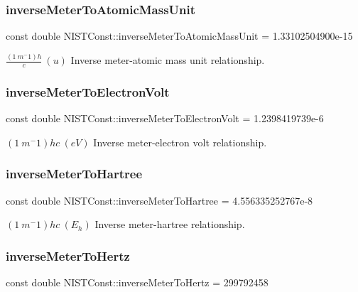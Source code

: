 \subsubsection{\texorpdfstring{inverse\+Meter\+To\+Atomic\+Mass\+Unit}{inverseMeterToAtomicMassUnit}}
{\footnotesize\ttfamily const double N\+I\+S\+T\+Const\+::inverse\+Meter\+To\+Atomic\+Mass\+Unit = 1.\+33102504900e-\/15}

$\frac{(1\ m^-1)h}{c} \ (u)$ Inverse meter-\/atomic mass unit relationship. \mbox{\label{group___inverse_meter_gafdede27a7699d3a180bb829b65fac447}} 
\subsubsection{\texorpdfstring{inverse\+Meter\+To\+Electron\+Volt}{inverseMeterToElectronVolt}}
{\footnotesize\ttfamily const double N\+I\+S\+T\+Const\+::inverse\+Meter\+To\+Electron\+Volt = 1.\+2398419739e-\/6}

$(1\ m^-1)hc \ (eV)$ Inverse meter-\/electron volt relationship. \mbox{\label{group___inverse_meter_ga6f47bdfe8997031b0f15229eb5bf4b9e}} 
\subsubsection{\texorpdfstring{inverse\+Meter\+To\+Hartree}{inverseMeterToHartree}}
{\footnotesize\ttfamily const double N\+I\+S\+T\+Const\+::inverse\+Meter\+To\+Hartree = 4.\+556335252767e-\/8}

$(1\ m^-1)hc \ (E_h)$ Inverse meter-\/hartree relationship. \mbox{\label{group___inverse_meter_ga5743c27316774c4f065336d0a016508e}} 
\subsubsection{\texorpdfstring{inverse\+Meter\+To\+Hertz}{inverseMeterToHertz}}
{\footnotesize\ttfamily const double N\+I\+S\+T\+Const\+::inverse\+Meter\+To\+Hertz = 299792458}

